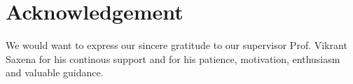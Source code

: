 \documentclass[12pt]{article}
\newenvironment{changemargin}[2]{
\begin{list}{}{
\setlength{\topsep}{0pt}
\setlength{\leftmargin}{#1}
\setlength{\rightmargin}{#2}
\setlength{\listparindent}{\parindent}
\setlength{\itemindent}{\parindent}
\setlength{\parsep}{\parskip}
}
\item[]}{\end{list}}
\begin{document}
\begin{changemargin}{-2cm}{-2cm}
    \section{Acknowledgement}
    We would want to express our sincere gratitude to our supervisor Prof. Vikrant Saxena for his continous support and for his patience, motivation, enthusiasm and valuable guidance.

    \printbibliography
\end{changemargin}
\end{document}

